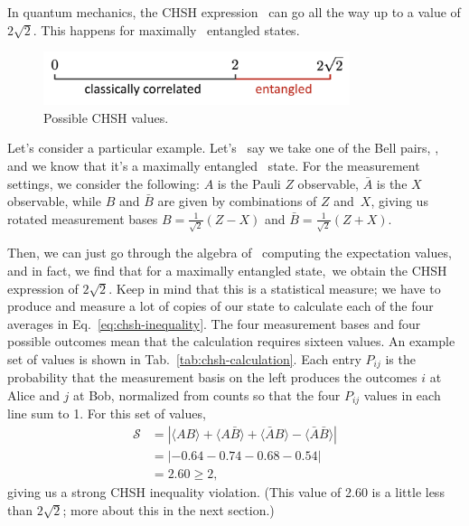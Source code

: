 In quantum mechanics, the CHSH expression 
can go all the way up to a value of $2\sqrt{2}$. This happens for maximally 
entangled states.

\begin{figure}[H]
    \centering
    \includegraphics[width=0.8\textwidth]{lesson10/chsh-values.png}
        \caption{Possible CHSH values.}
    \label{fig:chsh-values}
\end{figure}

Let's consider a particular example. Let's 
say we take one of the Bell pairs, \ket{\Psi^+},
and we know that it's a maximally entangled 
state. For the measurement settings,
we consider the following: $A$ is the Pauli $Z$ 
observable, $\bar{A}$ is the $X$ observable, while $B$ and $\bar{B}$ are given by combinations of $Z$ and $X$, giving us rotated measurement bases $B=\frac{1}{\sqrt{2}}(Z-X)$ and $\bar{B}=\frac{1}{\sqrt{2}}(Z+X)$.

Then, we can just go through the algebra of 
computing the expectation values, and in fact, we find that for a maximally entangled state, we obtain the CHSH expression of $2\sqrt{2}$. Keep in mind that this is a statistical measure; we have to produce and measure a lot of copies of our state to calculate each of the four averages in Eq.~\ref{eq:chsh-inequality}. The four measurement bases and four possible outcomes mean that the calculation requires sixteen values. An example set of values is shown in Tab.~\ref{tab:chsh-calculation}.  Each entry $P_{ij}$ is the probability that the measurement basis on the left produces the outcomes $i$ at Alice and $j$ at Bob, normalized from counts so that the four $P_{ij}$ values in each line sum to 1.  For this set of values,
\begin{equation}
\begin{aligned}
\mathcal{S} &= |\langle A B\rangle+\langle A \bar{B}\rangle+\langle\bar{A} B\rangle-\langle\bar{A} \bar{B}\rangle| \\
&= | -0.64 -0.74 - 0.68 - 0.54 | \\
&= 2.60 \geq 2,
\end{aligned}
\label{eq:chsh-example}
\end{equation}
giving us a strong CHSH inequality violation.  (This value of 2.60 is a little less than $2\sqrt{2}$; more about this in the next section.)

